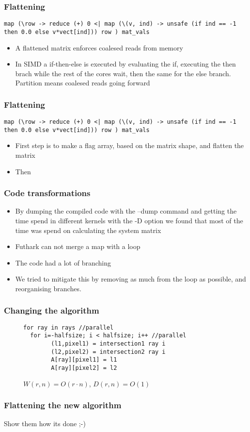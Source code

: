 \documentclass{beamer}
\begin{document}
\begin{frame}[fragile]
  \frametitle{Flattening}

  \begin{lstlisting}[frame=single, language=Futhark]
    map (\row -> reduce (+) 0 <| map (\(v, ind) -> unsafe (if ind == -1 then 0.0 else v*vect[ind])) row ) mat_vals
  \end{lstlisting}
  \begin{itemize}
    \item A flattened matrix enforces coalesed reads from memory
    \item In SIMD a if-then-else is executed by evaluating the if, executing the then brach while the rest of the cores wait, then the same for the else branch. Partition means coalesed reads going forward
  \end{itemize}
\end{frame}

\begin{frame}[fragile]
  \frametitle{Flattening}
  \begin{lstlisting}[frame=single, language=Futhark]
    map (\row -> reduce (+) 0 <| map (\(v, ind) -> unsafe (if ind == -1 then 0.0 else v*vect[ind])) row ) mat_vals
  \end{lstlisting}
  \begin{itemize}
    \item First step is to make a flag array, based on the matrix shape, and flatten the matrix
    \item Then
  \end{itemize}
  \end{frame}

\begin{frame}
\frametitle{Code transformations}
\begin{itemize}
\item{By dumping the compiled code with the --dump command and getting the time spend in different kernels with the -D option we found that most of the time was spend on calculating the system matrix}
\item{Futhark can not merge a map with a loop}
\item{The code had a lot of branching}
\item{We tried to mitigate this by removing as much from the loop as possible, and reorganising branches.}
\end{itemize}
\end{frame}

\begin{frame}[fragile]
\frametitle{Changing the algorithm}
\begin{figure}[!h]
\begin{lstlisting}[frame=single]
for ray in rays //parallel
  for i=-halfsize; i < halfsize; i++ //parallel
        (l1,pixel1) = intersection1 ray i
        (l2,pixel2) = intersection2 ray i
        A[ray][pixel1] = l1
        A[ray][pixel2] = l2
\end{lstlisting}
  \caption{$W(r,n)=O(r\cdot n)$, $D(r,n)=O(1)$}
\end{figure}
\end{frame}

\begin{frame}
\frametitle{Flattening the new algorithm}
Show them how its done ;-)
\end{frame}

 \begin{frame}
 \nocite{*}
 
 
 \end{frame}
\end{document}
